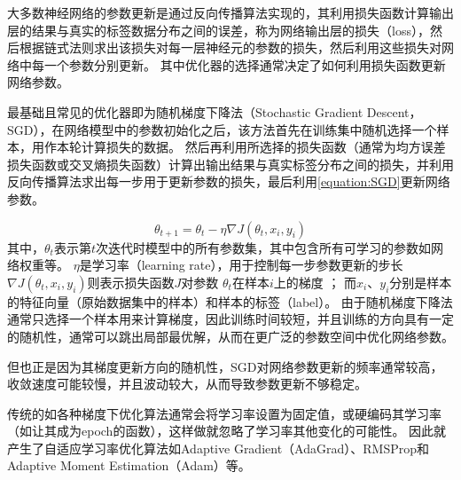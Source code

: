 大多数神经网络的参数更新是通过反向传播算法实现的，其利用损失函数计算输出层的结果与真实的标签数据分布之间的误差，称为网络输出层的损失（loss），然后根据链式法则求出该损失对每一层神经元的参数的损失，然后利用这些损失对网络中每一个参数分别更新。
其中优化器的选择通常决定了如何利用损失函数更新网络参数。

最基础且常见的优化器即为随机梯度下降法（Stochastic Gradient Descent，SGD），在网络模型中的参数初始化之后，该方法首先在训练集中随机选择一个样本，用作本轮计算损失的数据。
然后再利用所选择的损失函数（通常为均方误差损失函数或交叉熵损失函数）计算出输出结果与真实标签分布之间的损失，并利用反向传播算法求出每一步用于更新参数的损失，最后利用\cref{equation:SGD}更新网络参数。

\begin{equation}
  \label{equation:SGD}
  \theta_{t+1} = \theta_{t} - \eta \nabla J(\theta_{t}, x_i, y_i)
\end{equation}
其中，$\theta_{t}$表示第$t$次迭代时模型中的所有参数集，其中包含所有可学习的参数如网络权重等。
$\eta$是学习率（learning rate），用于控制每一步参数更新的步长
$\nabla J(\theta_{t}, x_i, y_i)$则表示损失函数$J$对参数 $\theta_{t}$在样本$i$上的梯度 ；
而$x_i$、$y_i$分别是样本的特征向量（原始数据集中的样本）和样本的标签（label）。
由于随机梯度下降法通常只选择一个样本用来计算梯度，因此训练时间较短，并且训练的方向具有一定的随机性，通常可以跳出局部最优解，从而在更广泛的参数空间中优化网络参数。

但也正是因为其梯度更新方向的随机性，SGD对网络参数更新的频率通常较高，收敛速度可能较慢，并且波动较大，从而导致参数更新不够稳定。

传统的如各种梯度下优化算法通常会将学习率设置为固定值，或硬编码其学习率（如让其成为epoch的函数），这样做就忽略了学习率其他变化的可能性。
因此就产生了自适应学习率优化算法如Adaptive Gradient（AdaGrad）、RMSProp和Adaptive Moment Estimation（Adam）等。

